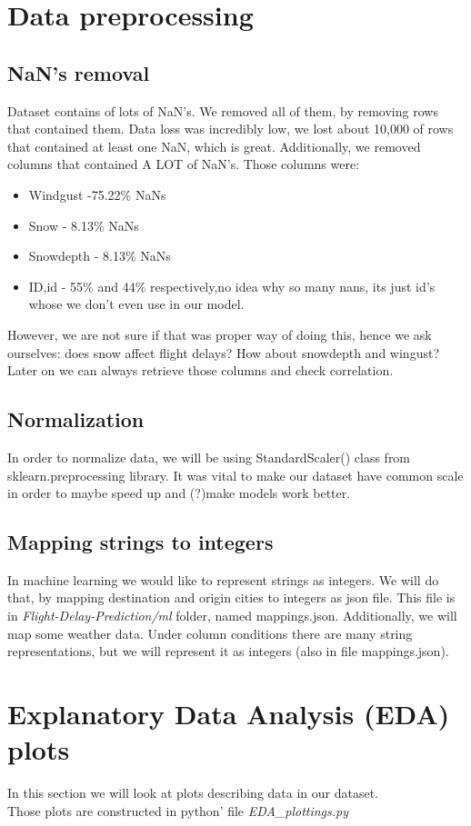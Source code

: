 \documentclass{article}
\begin{document}
\section{Data preprocessing}

\subsection{NaN's removal}
Dataset contains of lots of NaN's. We removed all of them, by removing rows that contained them. Data loss
was incredibly low, we lost about 10,000 of rows that contained at least one NaN, which is great. Additionally,
we removed columns that contained A LOT of NaN's. Those columns were:
	\begin{itemize}
		\item Windgust -75.22\% NaNs
		\item Snow - 8.13\% NaNs
		\item Snowdepth - 8.13\% NaNs
		\item ID,id - 55\% and 44\% respectively,no idea why so many nans, its just id's whose we don't even use in our model.
	\end{itemize}

However, we are not sure if that was proper way of doing this, hence we ask ourselves: does snow affect flight delays? How about snowdepth and wingust? Later on we can always retrieve those columns and check correlation.

\subsection{Normalization}
In order to normalize data, we will be using StandardScaler() class from sklearn.preprocessing library.
It was vital to make our dataset have common scale in order to maybe speed up and (?)make models work better.

\subsection{Mapping strings to integers}
In machine learning we would like to represent strings as integers. We will do that, by mapping destination and origin cities to integers
as json file. This file is in \textit{Flight-Delay-Prediction/ml} folder, named mappings.json. Additionally, we will map some weather data. Under column conditions there are many string representations, but we will represent it as integers (also in file mappings.json).

\newpage
\section{Explanatory Data Analysis (EDA) plots}
In this section we will look at plots describing data in our dataset.\\
Those plots are constructed in python' file \textit{EDA\_plottings.py} 
	
\end{document}
